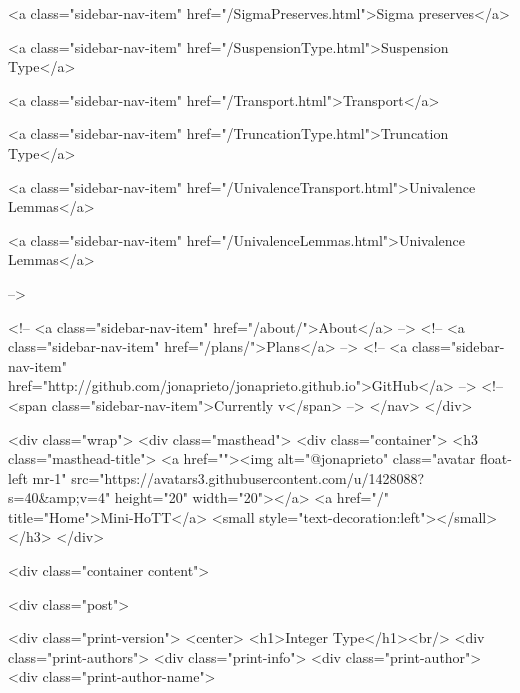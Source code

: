       
        
          <a class="sidebar-nav-item" href="/SigmaPreserves.html">Sigma preserves</a>
        
      
    
      
        
          <a class="sidebar-nav-item" href="/SuspensionType.html">Suspension Type</a>
        
      
    
      
        
          <a class="sidebar-nav-item" href="/Transport.html">Transport</a>
        
      
    
      
        
          <a class="sidebar-nav-item" href="/TruncationType.html">Truncation Type</a>
        
      
    
      
        
          <a class="sidebar-nav-item" href="/UnivalenceTransport.html">Univalence Lemmas</a>
        
      
    
      
        
          <a class="sidebar-nav-item" href="/UnivalenceLemmas.html">Univalence Lemmas</a>
        
      
     -->

    <!-- <a class="sidebar-nav-item" href="/about/">About</a> -->
    <!-- <a class="sidebar-nav-item" href="/plans/">Plans</a> -->
    <!-- <a class="sidebar-nav-item" href="http://github.com/jonaprieto/jonaprieto.github.io">GitHub</a> -->
    <!-- <span class="sidebar-nav-item">Currently v</span> -->
  </nav>
</div>

    <div class="wrap">
      <div class="masthead">
        <div class="container">
          <h3 class="masthead-title">
            <a href=""><img alt="@jonaprieto" class="avatar float-left mr-1" src="https://avatars3.githubusercontent.com/u/1428088?s=40&amp;v=4" height="20" width="20"></a>
            <a href="/" title="Home">Mini-HoTT</a>
            <small style="text-decoration:left"></small>
          </h3>
        </div>
      
      <div class="container content">
        







<div class="post">

  <div class="print-version">
    <center>
      <h1>Integer Type</h1><br/>
        <div class="print-authors">
          <div class="print-info">
            <div class="print-author">
              <div class="print-author-name">
                
